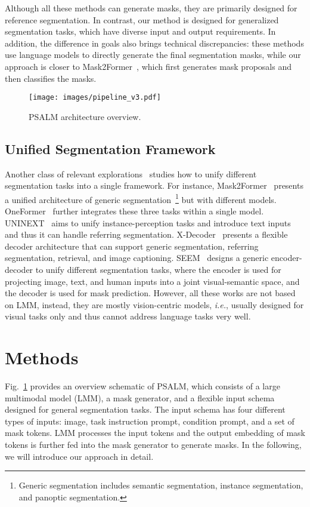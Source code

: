 Although all these methods can generate masks, they are primarily designed for reference segmentation. In contrast, our method is designed for generalized segmentation tasks, which have diverse input and output requirements. In addition, the difference in goals also brings technical discrepancies: these methods use language models to directly generate the final segmentation masks, while our approach is closer to Mask2Former~\cite{mask2former}, which first generates mask proposals and then classifies the masks.
\begin{figure}[!t]
  \centering
  \texttt{[image: images/pipeline\_v3.pdf]}
  \caption{PSALM architecture overview.}
  \label{fig:overview}
\end{figure}
\subsection{Unified Segmentation Framework}
Another class of relevant explorations~\cite{uninext,seem,omgseg,glee} studies how to unify different segmentation tasks into a single framework. For instance, Mask2Former~\cite{mask2former} presents a unified architecture of generic segmentation~\footnote{Generic segmentation includes semantic segmentation, instance segmentation, and panoptic segmentation.} but with different models.  OneFormer~\cite{jain2023oneformer} further integrates these three tasks within a single model. UNINEXT~\cite{uninext} aims to unify instance-perception tasks and introduce text inputs and thus it can handle referring segmentation. X-Decoder~\cite{xdecode} presents a flexible decoder architecture that can support generic segmentation, referring segmentation, retrieval, and image captioning. SEEM~\cite{seem} designs a generic encoder-decoder to unify different segmentation tasks, where the encoder is used for projecting image, text, and human inputs into a joint visual-semantic space, and the decoder is used for mask prediction. 
However, all these works are not based on LMM, instead, they are mostly vision-centric models, \textit{i.e.}, usually designed for visual tasks only and thus cannot address language tasks very well.

\section{Methods}

Fig.~\ref{fig:overview} provides an overview schematic of PSALM, which consists of a large multimodal model (LMM), a mask generator, and a flexible input schema designed for general segmentation tasks. The input schema has four different types of inputs: image, task instruction prompt, condition prompt, and a set of mask tokens. LMM processes the input tokens and the output embedding of mask tokens is further fed into the mask generator to generate masks. In the following, we will introduce our approach in detail.
